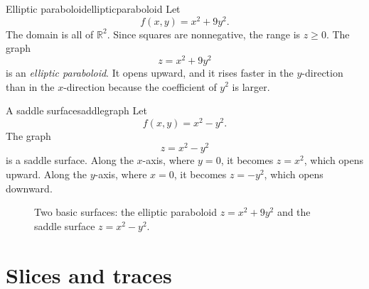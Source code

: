 \documentclass[11pt]{article}
\newcommand{\R}{\mathbb R}
\begin{document}
\begin{workedexample}{Elliptic paraboloid}{ellipticparaboloid}
Let
\[
f(x,y)=x^2+9y^2.
\]
The domain is all of $\R^2$. Since squares are nonnegative, the range is $z\ge 0$. The graph
\[
z=x^2+9y^2
\]
is an \emph{elliptic paraboloid}. It opens upward, and it rises faster in the $y$-direction than in the $x$-direction because the coefficient of $y^2$ is larger.
\end{workedexample}

\begin{workedexample}{A saddle surface}{saddlegraph}
Let
\[
f(x,y)=x^2-y^2.
\]
The graph
\[
z=x^2-y^2
\]
is a saddle surface. Along the $x$-axis, where $y=0$, it becomes $z=x^2$, which opens upward. Along the $y$-axis, where $x=0$, it becomes $z=-y^2$, which opens downward.
\end{workedexample}

\begin{figure}[H]
\centering
\begin{minipage}{0.49\textwidth}
\centering
{}
\end{minipage}
\hfill
\begin{minipage}{0.49\textwidth}
\centering
{}
\end{minipage}
\caption{Two basic surfaces: the elliptic paraboloid $z=x^2+9y^2$ and the saddle surface $z=x^2-y^2$.}
\end{figure}

\section{Slices and traces}
\end{document}
